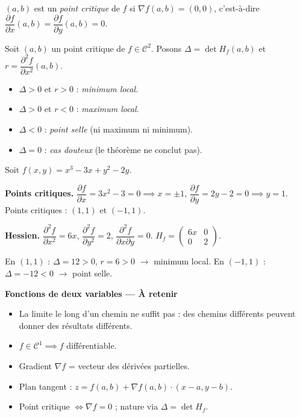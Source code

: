 \documentclass[11pt,a4paper,twoside]{book}
\begin{document}
\begin{definitionbox}
$(a,b)$ est un \emph{point critique} de $f$ si $\nabla f(a,b) = (0,0)$,
c'est-à-dire $\dfrac{\partial f}{\partial x}(a,b) = \dfrac{\partial f}{\partial y}(a,b) = 0$.
\end{definitionbox}

\begin{theoremebox}
Soit $(a,b)$ un point critique de $f \in \mathcal{C}^2$.
Posons $\Delta = \det H_f(a,b)$ et $r = \dfrac{\partial^2 f}{\partial x^2}(a,b)$.
\begin{itemize}
  \item $\Delta > 0$ et $r > 0$ : \emph{minimum local}.
  \item $\Delta > 0$ et $r < 0$ : \emph{maximum local}.
  \item $\Delta < 0$ : \emph{point selle} (ni maximum ni minimum).
  \item $\Delta = 0$ : \emph{cas douteux} (le théorème ne conclut pas).
\end{itemize}
\end{theoremebox}

\begin{exemplebox}
Soit $f(x,y) = x^3 - 3x + y^2 - 2y$.

\textbf{Points critiques.}
$\dfrac{\partial f}{\partial x} = 3x^2 - 3 = 0 \implies x = \pm 1$,\quad
$\dfrac{\partial f}{\partial y} = 2y - 2 = 0 \implies y = 1$.
Points critiques : $(1,1)$ et $(-1,1)$.

\textbf{Hessien.} $\dfrac{\partial^2 f}{\partial x^2} = 6x$, $\dfrac{\partial^2 f}{\partial y^2} = 2$, $\dfrac{\partial^2 f}{\partial x\partial y} = 0$.
$H_f = \begin{pmatrix}6x&0\\0&2\end{pmatrix}$.

En $(1,1)$ : $\Delta = 12 > 0$, $r = 6 > 0$ $\to$ minimum local.
En $(-1,1)$ : $\Delta = -12 < 0$ $\to$ point selle.
\end{exemplebox}

\begin{retenirbox}
\textbf{Fonctions de deux variables — À retenir}
\begin{itemize}
  \item La limite le long d'un chemin ne suffit pas : des chemins différents peuvent donner des résultats différents.
  \item $f \in \mathcal{C}^1 \implies f$ différentiable.
  \item Gradient $\nabla f$ = vecteur des dérivées partielles.
  \item Plan tangent : $z = f(a,b) + \nabla f(a,b) \cdot (x-a, y-b)$.
  \item Point critique $\iff \nabla f = 0$ ; nature via $\Delta = \det H_f$.
\end{itemize}
\end{retenirbox}
\end{document}
